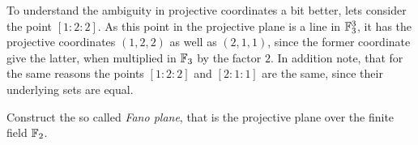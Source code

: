 \begin{example}
To understand the ambiguity in projective coordinates a bit better, lets consider the point $[1:2:2]$. As this point in the projective plane is a line in $\mathbb{F}_3^3$, it has the projective coordinates $(1,2,2)$ as well as $(2,1,1)$, since the former coordinate give the latter, when multiplied in $\mathbb{F}_3$ by the factor $2$. In addition note, that for the same reasons the points $[1:2:2]$ and $[2:1:1]$ are the same, since their underlying sets are equal.
\end{example}
\begin{exercise}
Construct the so called \textit{Fano plane}, that is the projective plane over the finite field $\mathbb{F}_2$.
\end{exercise}
